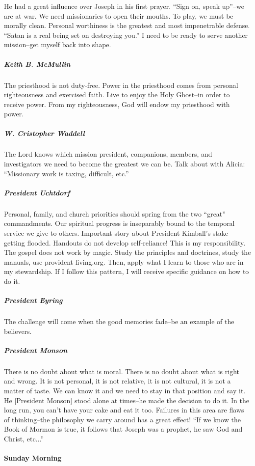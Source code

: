 He had a great influence over Joseph in his first prayer. ``Sign on, speak up''--we are at war. We need missionaries to open their mouths. To play, we must be morally clean. Personal worthiness is the greatest and most impenetrable defense. ``Satan is a real being set on destroying you.'' I need to be ready to serve another mission--get myself back into shape.

\subparagraph*{Keith B. McMullin} The priesthood is not duty-free. Power in the priesthood comes from personal righteousness and exercised faith. Live to enjoy the Holy Ghost--in order to receive power. From my righteousness, God will endow my priesthood with power.

\subparagraph*{W. Cristopher Waddell} The Lord knows which mission president, companions, members, and investigators we need to become the greatest we can be. Talk about with Alicia: ``Missionary work is taxing, difficult, etc.''

\subparagraph*{President Uchtdorf} Personal, family, and church priorities should spring from the two ``great'' commandments. Our spiritual progress is inseparably bound to the temporal service we give to others. Important story about President Kimball's stake getting flooded. Handouts do not develop self-reliance! This is my responsibility. The gospel does not work by magic. Study the principles and doctrines, study the manuals, use provident living.org. Then, apply what I learn to those who are in my stewardship. If I follow this pattern, I will receive specific guidance on how to do it.

\subparagraph*{President Eyring} The challenge will come when the good memories fade--be an example of the believers.

\subparagraph*{President Monson} There is no doubt about what is moral. There is no doubt about what is right and wrong. It is not personal, it is not relative, it is not cultural, it is not a matter of taste. We can know it and we need to stay in that position and say it. He [President Monson] stood alone at times--he made the decision to do it. In the long run, you can't have your cake and eat it too. Failures in this area are flaws of thinking--the philosophy we carry around has a great effect! ``If we know the Book of Mormon is true, it follows that Joseph was a prophet, he saw God and Christ, etc...''

\paragraph*{Sunday Morning}


